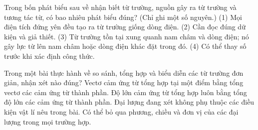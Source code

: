 \begin{ex}
Trong bốn phát biểu sau về nhận biết từ trường, nguồn gây ra từ trường và tương tác từ, có bao nhiêu phát biểu đúng? (Chỉ ghi một số nguyên.) (1) Mọi điện tích đứng yên đều tạo ra từ trường giống dòng điện. (2) Cần đọc đúng dữ kiện và giả thiết. (3) Từ trường tồn tại xung quanh nam châm và dòng điện; nó gây lực từ lên nam châm hoặc dòng điện khác đặt trong đó. (4) Có thể thay số trước khi xác định công thức.
\end{ex}

\begin{ex}
Trong một bài thực hành về so sánh, tổng hợp và biểu diễn các từ trường đơn giản, nhận xét nào đúng?
\choice
{\True Vectơ cảm ứng từ tổng hợp tại một điểm bằng tổng vectơ các cảm ứng từ thành phần.}
{Độ lớn cảm ứng từ tổng hợp luôn bằng tổng độ lớn các cảm ứng từ thành phần.}
{Đại lượng đang xét không phụ thuộc các điều kiện vật lí nêu trong bài.}
{Có thể bỏ qua phương, chiều và đơn vị của các đại lượng trong mọi trường hợp.}
\end{ex}

